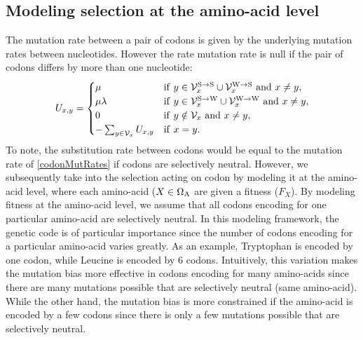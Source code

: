 \subsection{Modeling selection at the amino-acid level}
The mutation rate between a pair of \glspl{codon} is given by the underlying mutation rates between nucleotides. However the rate mutation rate is null if the pair of \glspl{codon} differs by more than one nucleotide:
\begin{equation}
\label{codonMutRates}
U_{x, y} =
\begin{cases}
\mu
& \mathrm{if} \ y \in  \mathcal{V}_x^{\mathrm{S} \rightarrow \mathrm{S}} \cup \mathcal{V}_x^{\mathrm{W} \rightarrow \mathrm{S}} \ \mathrm{ and } \ x \neq y, \\
\mu \lambda
& \mathrm{if} \ y \in \mathcal{V}_x^{\mathrm{S} \rightarrow \mathrm{W}} \cup \mathcal{V}_x^{\mathrm{W} \rightarrow \mathrm{W}}   \ \mathrm{ and } \ x \neq y, \\
0
& \mathrm{if} \  y \notin \mathcal{V}_x \ \mathrm{ and } \ x \neq y, \\
- \sum_{y \in \mathcal{V}_x }  U_{x, y} & \mathrm{if} \ x = y.
\end{cases}
\end{equation}
To note, the \gls{substitution} rate between \glspl{codon} would be equal to the mutation rate of \ref{codonMutRates} if \glspl{codon} are selectively \gls{neutral}. However, we subsequently take into the selection acting on \gls{codon} by modeling it at the amino-acid level, where each amino-acid ($X \in \Omega_{\mathrm{A}}$ are given a fitness ($F_X$). By modeling fitness at the amino-acid level, we assume that all \glspl{codon} encoding for one particular amino-acid are selectively \gls{neutral}. In this modeling framework, the genetic code is of particular importance since the number of \glspl{codon} encoding for a particular amino-acid varies greatly. As an example, Tryptophan is encoded by one \gls{codon}, while Leucine is encoded by 6 \glspl{codon}. Intuitively, this variation makes the mutation bias more effective in \glspl{codon} encoding for many amino-acids since there are many mutations possible that are selectively \gls{neutral} (same amino-acid). While the other hand, the mutation bias is more constrained if the amino-acid is encoded by a few \glspl{codon} since there is only a few mutations possible that are selectively \gls{neutral}.\\

